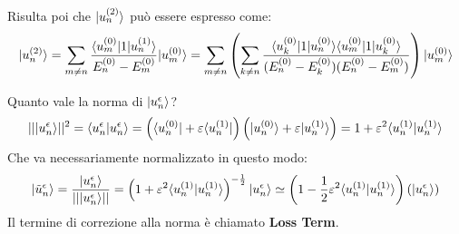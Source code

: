Risulta poi che $\Ket {u_n^{(2)}}$ può essere espresso come:
\[
	\Ket {u_n^{(2)}} = \sum_{m \neq n} \frac{\Bra {u_m^{(0)}} \V \Ket {u_n^{(1)}}}{E_n^{(0)} - E_m^{(0)}} \Ket {u_m^{(0)}} = \sum_{m \neq n} \left( \sum_{k \neq n} \frac{\Bra {u_k^{(0)}} \V \Ket {u_n^{(0)}} \Bra {u_m^{(0)}} \V \Ket {u_k^{(0)}}}{(E_n^{(0)} - E_k^{(0)})(E_n^{(0)} - E_m^{(0)})} \right) \Ket {u_m^{(0)}}
\]

Quanto vale la norma di $\Ket {u_n^\epsilon}$?
\[
	||\Ket {u_n^\epsilon}||^2 = \braket {u_n^\epsilon}{u_n^\epsilon} = \left( \Bra {u_n^{(0)}} + \varepsilon \Bra {u_n^{(1)}} \right) \left( \Ket {u_n^{(0)}} + \varepsilon \Ket {u_n^{(1)}} \right) = 1 + \varepsilon^2 \braket {u_n^{(1)}}{u_n^{(1)}}
\]
Che va necessariamente normalizzato in questo modo:
\[
	\Ket {\tilde{u}_n^\epsilon} = \frac{\Ket {u_n^\epsilon}}{||\Ket {u_n^\epsilon}||} = \left( 1 + \varepsilon^2 \braket {u_n^{(1)}}{u_n^{(1)}} \right)^{-\half} \Ket {u_n^\epsilon} \simeq \left( 1 - \half \varepsilon^2 \braket {u_n^{(1)}}{u_n^{(1)}} \right) \left( \Ket {u_n^\epsilon} \right)
\]
Il termine di correzione alla norma è chiamato \textbf{Loss Term}.